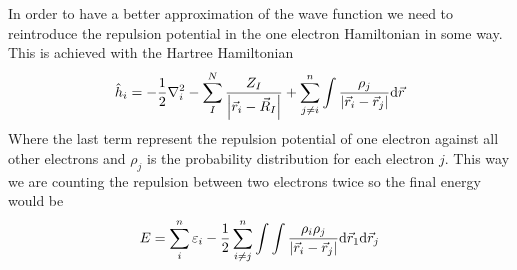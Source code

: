 \documentclass[../master_thesis.tex]{subfiles}
\begin{document}
In order to have a better approximation of the wave function we need to reintroduce
the repulsion potential in the one electron Hamiltonian in some way. This is achieved with
the Hartree Hamiltonian\cite{Cramer:2004}
\begin{equation}\label{eq:hartreeham}
  \hat{h}_i = -\frac{1}{2}\nabla^2_i - \sum^N_I\frac{Z_I}{\abs{\vec{r}_i - \vec{R}_I}} + \sum_{j\neq i}^n\int \frac{\rho_j}{\abs{\vec{r}_i - \vec{r}_j}}\text{d}\vec{r}
\end{equation}
Where the last term represent the repulsion potential of one electron against
all other electrons and $\rho_j$ is the probability distribution for each electron
$j$. This way we are counting the repulsion between two electrons twice so the
final energy would be
\begin{equation}
  E = \sum_i^n\varepsilon_i - \frac{1}{2}\sum_{i\neq j}^n\int\int\frac{\rho_i\rho_j}{\abs{\vec{r}_i - \vec{r}_j}}\text{d}\vec{r}_1\text{d}\vec{r}_j
\end{equation}
\end{document}
